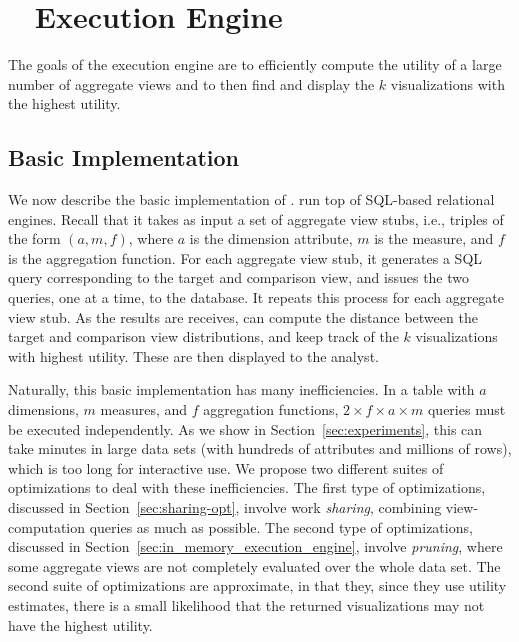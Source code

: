 \section{{\large \SeeDB\ } Execution Engine}
The goals of the \SeeDB execution engine are to efficiently
compute the utility of a large number of aggregate views
and to then find and display the $k$ visualizations with the highest utility.

\subsection{Basic Implementation} \label{sec:dbms-exec-engine}

We now describe the basic implementation of \SeeDB.
\SeeDB run top of SQL-based relational 
engines.  Recall that it takes as input a set of 
aggregate view stubs, i.e., triples of the form
$(a, m, f)$, where $a$ is the dimension attribute, $m$ is the measure,
and $f$ is the aggregation function.
For each aggregate view stub, it generates
a SQL query corresponding to the target
and comparison view, and issues
the two queries, one at a time, to the database.
It repeats this process for each aggregate view stub.
As the results are receives, \SeeDB can compute the
distance between the target and comparison view
distributions, and keep track of the $k$ visualizations
with highest utility. These are then displayed
to the analyst.


Naturally, this basic implementation has many inefficiencies.
In a table with $a$ dimensions, $m$ measures, and $f$ aggregation functions, 
$2\times f \times a \times  m$ queries must be executed independently.  
As we show in Section~\ref{sec:experiments}, this can take minutes in
large data sets (with hundreds of attributes and millions of rows), which is too long for interactive use. 
We propose two different suites of optimizations to deal with these
inefficiencies.
The first type of optimizations, discussed in Section~\ref{sec:sharing-opt}, involve work {\em sharing}, 
combining view-computation queries as much as possible.
The second type of optimizations, discussed in Section~\ref{sec:in_memory_execution_engine}, involve {\em pruning}, where some aggregate views are
not completely evaluated over the whole data set.
 The second suite of optimizations
are approximate, in that they, since they use utility estimates, there is a small likelihood that the returned visualizations may not have the highest utility.

